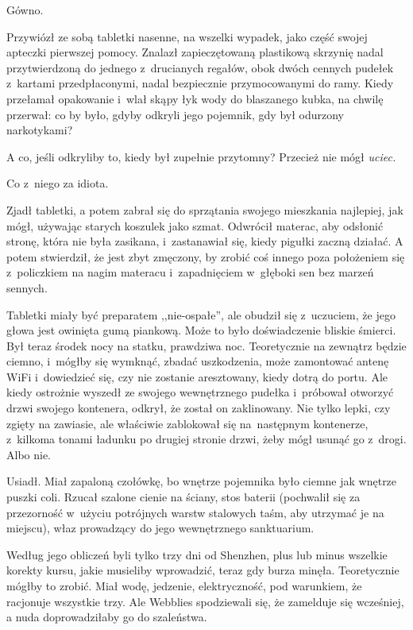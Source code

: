 \documentclass[oneside,polish,11pt,rmheadings]{mwbk}
\begin{document}
Gówno. 

Przywiózł ze sobą tabletki nasenne, na wszelki wypadek, jako część swojej apteczki pierwszej pomocy. Znalazł zapieczętowaną plastikową skrzynię nadal przytwierdzoną do jednego z~drucianych regałów, obok dwóch cennych pudełek z~kartami przedpłaconymi, nadal bezpiecznie przymocowanymi do ramy. Kiedy przełamał opakowanie i~wlał skąpy łyk wody do blaszanego kubka, na chwilę przerwał: co by było, gdyby odkryli jego pojemnik, gdy był odurzony narkotykami?

A co, jeśli odkryliby to, kiedy był zupełnie przytomny? Przecież nie mógł \textit{uciec.}

Co z~niego za idiota.

Zjadł tabletki, a potem zabrał się do sprzątania swojego mieszkania najlepiej, jak mógł, używając starych koszulek jako szmat. Odwrócił materac, aby odsłonić stronę, która nie była zasikana, i~zastanawiał się, kiedy pigułki zaczną działać. A potem stwierdził, że jest zbyt zmęczony, by zrobić coś innego poza położeniem się z~policzkiem na nagim materacu i~zapadnięciem w~głęboki sen bez marzeń sennych.

Tabletki miały być preparatem ,,nie-ospałe'', ale obudził się z~uczuciem, że jego głowa jest owinięta gumą piankową. Może to było doświadczenie bliskie śmierci. Był teraz środek nocy na statku, prawdziwa noc. Teoretycznie na zewnątrz będzie ciemno, i~mógłby się wymknąć, zbadać uszkodzenia, może zamontować antenę WiFi i~dowiedzieć się, czy nie zostanie aresztowany, kiedy dotrą do portu. Ale kiedy ostrożnie wyszedł ze swojego wewnętrznego pudełka i~próbował otworzyć drzwi swojego kontenera, odkrył, że został on zaklinowany. Nie tylko lepki, czy zgięty na zawiasie, ale właściwie zablokował się na~następnym kontenerze, z~kilkoma tonami ładunku po drugiej stronie drzwi, żeby mógł usunąć go z~drogi. Albo nie.

Usiadł. Miał zapaloną czołówkę, bo wnętrze pojemnika było ciemne jak wnętrze puszki coli. Rzucał szalone cienie na ściany, stos baterii (pochwalił się za przezorność w~użyciu potrójnych warstw stalowych taśm, aby utrzymać je na miejscu), właz prowadzący do jego wewnętrznego sanktuarium.

Według jego obliczeń byli tylko trzy dni od Shenzhen, plus lub minus wszelkie korekty kursu, jakie musieliby wprowadzić, teraz gdy burza minęła. Teoretycznie mógłby to zrobić. Miał wodę, jedzenie, elektryczność, pod warunkiem, że racjonuje wszystkie trzy. Ale Webblies spodziewali się, że zamelduje się wcześniej, a nuda doprowadziłaby go do szaleństwa.
\end{document}
